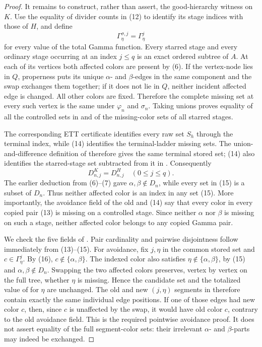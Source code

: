 \begin{proof}
It remains to construct, rather than assert, the good-hierarchy witness
on $K$.  Use the equality of divider counts in (12) to identify its stage
indices with those of $H$, and define
\[
                    \Gamma^{\sigma,j}_\eta=\Gamma^j_\eta       \tag{13}
\]
for every value of the total Gamma function.  Every starred stage and
every ordinary stage occurring at an index $j\leq q$ is an exact ordered
subtree of $A$.  At each of its vertices both affected colors are present
by (6).  If the vertex-node lies in $Q$, properness puts its unique
$\alpha$- and $\beta$-edges in the same component and the swap exchanges
them together; if it does not lie in $Q$, neither incident affected edge
is changed.  All other colors are fixed.  Therefore the complete missing
set at every such vertex is the same under $\varphi_n$ and $\sigma_n$.
Taking unions proves equality of all the controlled sets in
 and of the missing-color sets of
all starred stages.                                                   

The corresponding ETT certificate identifies every raw set $S_h$ through
the terminal index, while (14) identifies the terminal-ladder missing
sets.  The union-and-difference definition of
 therefore gives the same terminal stored
set; (14) also identifies the starred-stage set subtracted from it in
.  Consequently
\[
                  D^K_{n,j}=D^H_{n,j}\quad(0\leq j\leq q).     \tag{15}
\]
The earlier deduction from (6)--(7) gave
$\alpha,\beta\notin D_n$, while every set in (15) is a subset of $D_n$.
Thus neither affected color is an index in any set (15).  More
importantly, the avoidance field of the old  and
(14) say that every color in every copied pair (13) is missing on a
controlled stage.  Since neither $\alpha$ nor $\beta$ is missing on such
a stage, neither affected color belongs to any copied Gamma pair.       

We check the five fields of .
Pair cardinality and pairwise disjointness follow immediately from
(13)--(15).  For avoidance, fix $j,\eta$ in the common stored set and
$c\in\Gamma^j_\eta$.  By (16), $c\notin\{\alpha,\beta\}$.  The indexed
color also satisfies $\eta\notin\{\alpha,\beta\}$, by (15) and
$\alpha,\beta\notin D_n$.  Swapping the two affected colors preserves,
vertex by vertex on the full tree, whether $\eta$ is missing.  Hence the
candidate set and the totalized value of
 for $\eta$ are unchanged.  The old and
new $(j,\eta)$ segments in  therefore
contain exactly the same individual edge positions.  If one of those
edges had new color $c$, then, since $c$ is unaffected by the swap, it
would have old color $c$, contrary to the old avoidance field.  This is
the required pointwise avoidance proof.  It does not assert equality of
the full segment-color sets: their irrelevant $\alpha$- and $\beta$-parts
may indeed be exchanged.


\end{proof}
